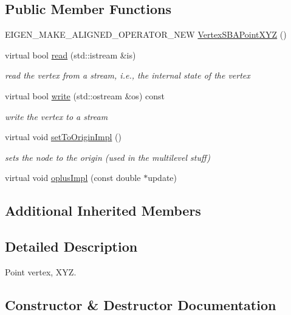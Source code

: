 \subsection*{Public Member Functions}
\begin{DoxyCompactItemize}
\item 
E\+I\+G\+E\+N\+\_\+\+M\+A\+K\+E\+\_\+\+A\+L\+I\+G\+N\+E\+D\+\_\+\+O\+P\+E\+R\+A\+T\+O\+R\+\_\+\+N\+EW \mbox{\hyperlink{classg2o_1_1_vertex_s_b_a_point_x_y_z_ad2b835ac63c1bbe22975a409151036d8}{Vertex\+S\+B\+A\+Point\+X\+YZ}} ()
\item 
virtual bool \mbox{\hyperlink{classg2o_1_1_vertex_s_b_a_point_x_y_z_a3668aa23ed3fc7e2c3e6bddda7ddcd1a}{read}} (std\+::istream \&is)
\begin{DoxyCompactList}\small\item\em read the vertex from a stream, i.\+e., the internal state of the vertex \end{DoxyCompactList}\item 
virtual bool \mbox{\hyperlink{classg2o_1_1_vertex_s_b_a_point_x_y_z_a6b2fc33f2107c039d441e1bd2a17973a}{write}} (std\+::ostream \&os) const
\begin{DoxyCompactList}\small\item\em write the vertex to a stream \end{DoxyCompactList}\item 
virtual void \mbox{\hyperlink{classg2o_1_1_vertex_s_b_a_point_x_y_z_a787b72465f35a3f30fcbb6b8056b47c4}{set\+To\+Origin\+Impl}} ()
\begin{DoxyCompactList}\small\item\em sets the node to the origin (used in the multilevel stuff) \end{DoxyCompactList}\item 
virtual void \mbox{\hyperlink{classg2o_1_1_vertex_s_b_a_point_x_y_z_aa2a13838edc46ed5395fee5c07c4c8ea}{oplus\+Impl}} (const double $\ast$update)
\end{DoxyCompactItemize}
\subsection*{Additional Inherited Members}


\subsection{Detailed Description}
Point vertex, X\+YZ. 

\subsection{Constructor \& Destructor Documentation}
\mbox{\label{classg2o_1_1_vertex_s_b_a_point_x_y_z_ad2b835ac63c1bbe22975a409151036d8}} 
